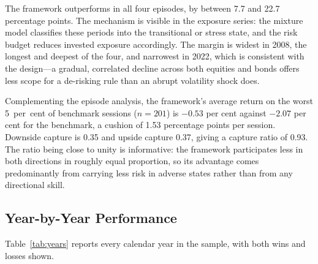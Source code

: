 \documentclass{singlecol-new}
\theoremstyle{TH}{
\newtheorem{lemma}{Lemma}
\newtheorem{theorem}[lemma]{Theorem}
\newtheorem{corrolary}[lemma]{Corrolary}
\newtheorem{conjecture}[lemma]{Conjecture}
\newtheorem{proposition}[lemma]{Proposition}
\newtheorem{claim}[lemma]{Claim}
\newtheorem{stheorem}[lemma]{Wrong Theorem}
\newtheorem{algorithm}{Algorithm}
}
\theoremstyle{THrm}{
\newtheorem{definition}{Definition}[section]
\newtheorem{question}{Question}[section]
\newtheorem{remark}{Remark}
\newtheorem{scheme}{Scheme}
}
\theoremstyle{THhit}{
\newtheorem{case}{Case}[section]
}
\begin{document}
The framework outperforms in all four episodes, by between 7.7 and 22.7 percentage
points. The mechanism is visible in the exposure series: the mixture model classifies
these periods into the transitional or stress state, and the risk budget reduces
invested exposure accordingly. The margin is widest in 2008, the longest and deepest of
the four, and narrowest in 2022, which is consistent with the design---a gradual,
correlated decline across both equities and bonds offers less scope for a de-risking
rule than an abrupt volatility shock does.

Complementing the episode analysis, the framework's average return on the worst
5~per~cent of benchmark sessions ($n = 201$) is $-0.53$ per cent against $-2.07$ per
cent for the benchmark, a cushion of 1.53 percentage points per session. Downside
capture is 0.35 and upside capture 0.37, giving a capture ratio of 0.93. The ratio
being close to unity is informative: the framework participates less in both directions
in roughly equal proportion, so its advantage comes predominantly from carrying less
risk in adverse states rather than from any directional skill.

\subsection{Year-by-Year Performance}

Table~\ref{tab:years} reports every calendar year in the sample, with both wins and losses shown.
\end{document}
